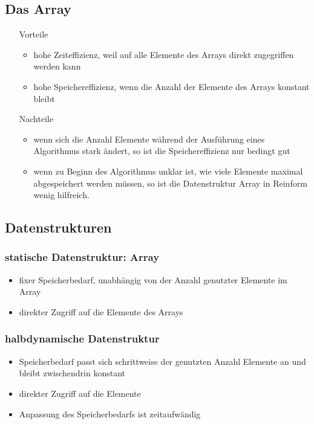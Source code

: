 \documentclass[a4paper,10pt]{article}
\begin{document}
\subsection{Das Array}

\begin{itemize}
	\item[Vorteile] 
		\begin{itemize}
			\item hohe Zeiteffizienz, weil auf alle Elemente des Arrays direkt zugegriffen werden kann
			\item hohe Speichereffizienz, wenn die Anzahl der Elemente des Arrays konstant bleibt
		\end{itemize}
	\item[Nachteile] 
		\begin{itemize}
			\item wenn sich die Anzahl Elemente w\"ahrend der Ausf\"uhrung eines Algorithmus stark \"andert, so ist die Speichereffizienz nur bedingt gut
			\item wenn zu Beginn des Algorithmus unklar ist, wie viele Elemente maximal abgespeichert werden m\"ussen, so ist die Datenstruktur Array in Reinform wenig hilfreich.
		\end{itemize}
\end{itemize}

\subsection{Datenstrukturen}

\subsubsection{statische Datenstruktur: Array}
\begin{itemize}
	\item fixer Speicherbedarf, unabh\"angig von der Anzahl genutzter Elemente im Array
	\item direkter Zugriff auf die Elemente des Arrays
\end{itemize}

\subsubsection{halbdynamische Datenstruktur}
\begin{itemize}
	\item Speicherbedarf passt sich schrittweise der genutzten Anzahl Elemente an und bleibt zwischendrin konstant
	\item direkter Zugriff auf die Elemente
	\item Anpassung des Speicherbedarfs ist zeitaufw\"andig
\end{itemize}
\end{document}
